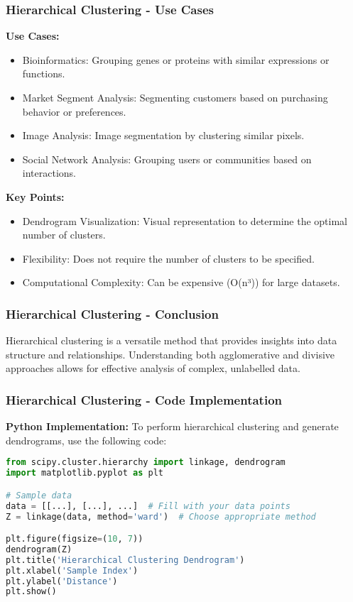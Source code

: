 \documentclass[aspectratio=169]{beamer}
\begin{document}
\begin{frame}[fragile]
    \frametitle{Hierarchical Clustering - Use Cases}
    \textbf{Use Cases:}
    \begin{itemize}
        \item Bioinformatics: Grouping genes or proteins with similar expressions or functions.
        \item Market Segment Analysis: Segmenting customers based on purchasing behavior or preferences.
        \item Image Analysis: Image segmentation by clustering similar pixels.
        \item Social Network Analysis: Grouping users or communities based on interactions.
    \end{itemize}

    \textbf{Key Points:}
    \begin{itemize}
        \item Dendrogram Visualization: Visual representation to determine the optimal number of clusters.
        \item Flexibility: Does not require the number of clusters to be specified.
        \item Computational Complexity: Can be expensive (O(n³)) for large datasets.
    \end{itemize}
\end{frame}

\begin{frame}[fragile]
    \frametitle{Hierarchical Clustering - Conclusion}
    Hierarchical clustering is a versatile method that provides insights into data structure and relationships. 
    Understanding both agglomerative and divisive approaches allows for effective analysis of complex, unlabelled data.
\end{frame}

\begin{frame}[fragile]
    \frametitle{Hierarchical Clustering - Code Implementation}
    \textbf{Python Implementation:}
    To perform hierarchical clustering and generate dendrograms, use the following code:
    \begin{lstlisting}[language=Python]
from scipy.cluster.hierarchy import linkage, dendrogram
import matplotlib.pyplot as plt

# Sample data
data = [[...], [...], ...]  # Fill with your data points
Z = linkage(data, method='ward')  # Choose appropriate method

plt.figure(figsize=(10, 7))
dendrogram(Z)
plt.title('Hierarchical Clustering Dendrogram')
plt.xlabel('Sample Index')
plt.ylabel('Distance')
plt.show()
    \end{lstlisting}
\end{frame}
\end{document}
